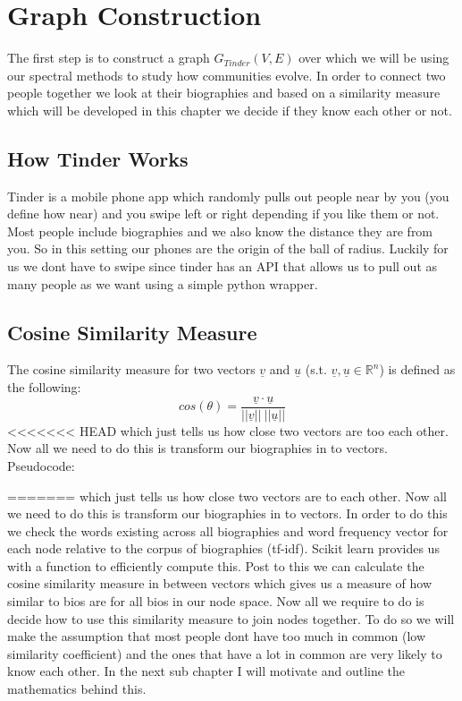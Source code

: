 \documentclass[10pt,twocolumn]{article}
\begin{document}
\section{Graph Construction}
The first step is to construct a graph $G_{Tinder}(V,E)$ over which we will be using our spectral methods to study how communities evolve. In order to connect two people together we look at their biographies and based on a similarity measure which will be developed in this chapter we decide if they know each other or not. 
\subsection{How Tinder Works}
Tinder is a mobile phone app which randomly pulls out people near by you (you define how near) and you swipe left or right depending if you like them or not. Most people include biographies and we also know the distance they are from you. So in this setting our phones are the origin of the ball of radius. Luckily for us we dont have to swipe since tinder has an API that allows us to  pull out as many people as we want using a simple python wrapper.
\subsection{Cosine Similarity Measure}
The cosine similarity measure for two vectors $\underline{v} $ and $\underline{u}$ (s.t. $\underline{v}, \underline{u} \in \mathbb{R}^{n}$) is defined as the following:
\[
cos(\theta) = \frac{\underline{v}\cdot \underline{u}}{||\underline{v}|| \: ||\underline{u}||}
\]
<<<<<<< HEAD
which just tells us how close two vectors are too each other. Now all we need to do this is transform our biographies in to vectors.
Pseudocode:

=======
which just tells us how close two vectors are to each other. Now all we need to do this is transform our biographies in to vectors. In order to do this we check the words existing across all biographies and word frequency vector for each node relative to the corpus of biographies (tf-idf). Scikit learn provides us with a function to efficiently compute this. 
\newline\newline
Post to this
we can calculate the cosine similarity measure in between vectors which gives us a measure of how similar to bios are for all bios in our node space.
\newline\newline 
Now all we require to do is decide how to use this similarity measure to join nodes together. To do so we will make the assumption that most people dont have too much in common (low similarity coefficient) and the ones that have a lot in common are very likely to know each other. In the next sub chapter I will motivate and outline the mathematics behind this.
\end{document}
